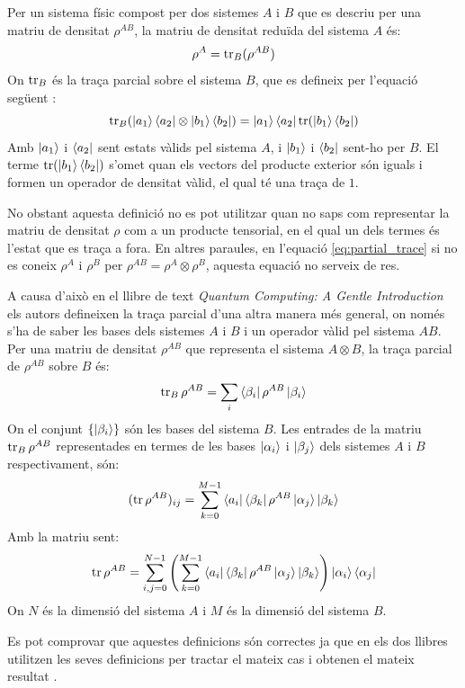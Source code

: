 Per un sistema físic compost per dos sistemes $A$ i $B$ que es descriu per una matriu de densitat $\rho^{AB}$, la matriu de densitat reduïda del sistema $A$ és:
\begin{equation}
\rho^A = \tr_B(\rho^{AB})
	\label{eq:partial_trace}
\end{equation}
On $\tr_B$ és la traça parcial sobre el sistema $B$, que es defineix per l'equació següent \cite{QCandQI:partial_trace}: 
\begin{equation*}
	\tr_B(\ket{a_1}\bra{a_2}\otimes\ket{b_1}\bra{b_2}) = \ket{a_1}\bra{a_2}\tr(\ket{b_1}\bra{b_2})
\end{equation*}
Amb $\ket{a_1}$ i $\bra{a_2}$ sent estats vàlids pel sistema $A$, i $\ket{b_1}$ i $\bra{b_2}$ sent-ho per $B$. El terme $\tr(\ket{b_1}\bra{b_2})$ s'omet quan els vectors del producte exterior són iguals i formen un operador de densitat vàlid, el qual té una traça de $1$.

No obstant aquesta definició no es pot utilitzar quan no saps com representar la matriu de densitat $\rho$ com a un producte tensorial, en el qual un dels termes és l'estat que es traça a fora. En altres paraules, en l'equació \ref{eq:partial_trace} si no es coneix $\rho^A$ i $\rho^B$ per $\rho^{AB} = \rho^A\otimes\rho^B$, aquesta equació no serveix de res.

A causa d'això en el llibre de text \textit{Quantum Computing: A Gentle Introduction} \cite{QC_intro} els autors defineixen la traça parcial d'una altra manera més general, on només s'ha de saber les bases dels sistemes $A$ i $B$ i un operador vàlid pel sistema $AB$. Per una matriu de densitat $\rho^{AB}$ que representa el sistema $A\otimes B$, la traça parcial de $\rho^{AB}$ sobre $B$ és:
$$
\tr_B \rho^{AB} = \sum_i \bra{\beta_i}\rho^{AB}\ket{\beta_i}
$$
On el conjunt $\{ \ket{\beta_i} \}$ són les bases del sistema $B$. Les entrades de la matriu $\tr_B \rho^{AB}$ representades en termes de les bases ${\ket{\alpha_i}}$ i ${\ket{\beta_j}}$ dels sistemes $A$ i $B$ respectivament, són:
$$
(\tr\rho^{AB})_{ij} = \sum_{k=0}^{M-1} \bra{a_i}\bra{\beta_k}\rho^{AB}\ket{\alpha_j}\ket{\beta_k}
$$
Amb la matriu sent:
$$
\tr\rho^{AB} = 
\sum_{i,j=0}^{N-1}\left(\sum_{k=0}^{M-1} \bra{a_i}\bra{\beta_k}\rho^{AB}\ket{\alpha_j}\ket{\beta_k}\right) \ket{\alpha_i}\bra{\alpha_j}
$$
On $N$ és la dimensió del sistema $A$ i $M$ és la dimensió del sistema $B$. 

Es pot comprovar que aquestes definicions són correctes ja que en els dos llibres utilitzen les seves definicions per tractar el mateix cas i obtenen el mateix resultat \cite{QCandQI:example_partial, QC_intro:example_partial}.

